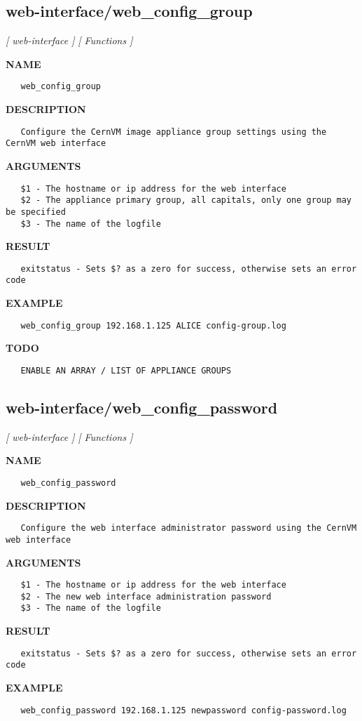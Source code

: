 \subsection{web-interface/web\_config\_group}
\textsl{[ web-interface ]}
\textsl{[ Functions ]}

\label{ch:robo65}
\label{ch:web_interface_web_config_group}
\textbf{NAME}
\begin{verbatim}
   web_config_group
\end{verbatim}
\textbf{DESCRIPTION}
\begin{verbatim}
   Configure the CernVM image appliance group settings using the CernVM web interface
\end{verbatim}
\textbf{ARGUMENTS}
\begin{verbatim}
   $1 - The hostname or ip address for the web interface
   $2 - The appliance primary group, all capitals, only one group may be specified
   $3 - The name of the logfile
\end{verbatim}
\textbf{RESULT}
\begin{verbatim}
   exitstatus - Sets $? as a zero for success, otherwise sets an error code
\end{verbatim}
\textbf{EXAMPLE}
\begin{verbatim}
   web_config_group 192.168.1.125 ALICE config-group.log
\end{verbatim}
\textbf{TODO}
\begin{verbatim}
   ENABLE AN ARRAY / LIST OF APPLIANCE GROUPS
\end{verbatim}
\newpage
\subsection{web-interface/web\_config\_password}
\textsl{[ web-interface ]}
\textsl{[ Functions ]}

\label{ch:robo66}
\label{ch:web_interface_web_config_password}
\textbf{NAME}
\begin{verbatim}
   web_config_password
\end{verbatim}
\textbf{DESCRIPTION}
\begin{verbatim}
   Configure the web interface administrator password using the CernVM web interface
\end{verbatim}
\textbf{ARGUMENTS}
\begin{verbatim}
   $1 - The hostname or ip address for the web interface
   $2 - The new web interface administration password
   $3 - The name of the logfile
\end{verbatim}
\textbf{RESULT}
\begin{verbatim}
   exitstatus - Sets $? as a zero for success, otherwise sets an error code
\end{verbatim}
\textbf{EXAMPLE}
\begin{verbatim}
   web_config_password 192.168.1.125 newpassword config-password.log
\end{verbatim}
\newpage
